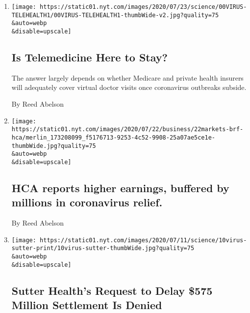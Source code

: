 \begin{enumerate}
\def\labelenumi{\arabic{enumi}.}
\item
  \href{/2020/08/03/health/covid-telemedicine-congress.html}{}

  \texttt{[image: https://static01.nyt.com/images/2020/07/23/science/00VIRUS-TELEHEALTH1/00VIRUS-TELEHEALTH1-thumbWide-v2.jpg?quality=75\\\&auto=webp\\\&disable=upscale]}

  \hypertarget{is-telemedicine-here-to-stay}{%
  \subsection{Is Telemedicine Here to
  Stay?}\label{is-telemedicine-here-to-stay}}

  The answer largely depends on whether Medicare and private health
  insurers will adequately cover virtual doctor visits once coronavirus
  outbreaks subside.

  By Reed Abelson
\item
  \href{/2020/07/22/business/hca-reports-higher-earnings-buffered-by-millions-in-coronavirus-relief.html}{}

  \texttt{[image: https://static01.nyt.com/images/2020/07/22/business/22markets-brf-hca/merlin\_173208099\_f5176713-9253-4c52-9908-25a07ae5ce1e-thumbWide.jpg?quality=75\\\&auto=webp\\\&disable=upscale]}

  \hypertarget{hca-reports-higher-earnings-buffered-by-millions-in-coronavirus-relief}{%
  \subsection{HCA reports higher earnings, buffered by millions in
  coronavirus
  relief.}\label{hca-reports-higher-earnings-buffered-by-millions-in-coronavirus-relief}}

  By Reed Abelson
\item
  \href{/2020/07/10/health/coronavirus-sutter-california-hospitals.html}{}

  \texttt{[image: https://static01.nyt.com/images/2020/07/11/science/10virus-sutter-print/10virus-sutter-thumbWide.jpg?quality=75\\\&auto=webp\\\&disable=upscale]}

  \hypertarget{sutter-healths-request-to-delay-575-million-settlement-is-denied}{%
  \subsection{Sutter Health's Request to Delay \$575 Million Settlement
  Is
  Denied}\label{sutter-healths-request-to-delay-575-million-settlement-is-denied}}


\end{enumerate}
